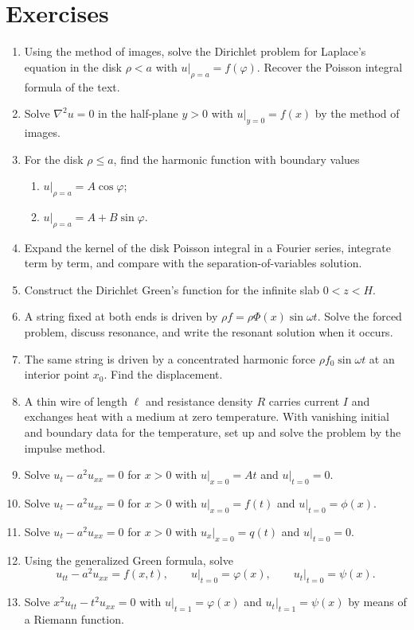 \section{Exercises}

\begin{enumerate}
\item Using the method of images, solve the Dirichlet problem for Laplace's equation in the disk $\rho<a$ with $u|_{\rho=a}=f(\varphi)$. Recover the Poisson integral formula of the text.

\item Solve $\nabla^2 u=0$ in the half-plane $y>0$ with $u|_{y=0}=f(x)$ by the method of images.

\item For the disk $\rho\le a$, find the harmonic function with boundary values
\begin{enumerate}
\item $u|_{\rho=a}=A\cos\varphi$;
\item $u|_{\rho=a}=A+B\sin\varphi$.
\end{enumerate}

\item Expand the kernel of the disk Poisson integral in a Fourier series, integrate term by term, and compare with the separation-of-variables solution.

\item Construct the Dirichlet Green's function for the infinite slab $0<z<H$.

\item A string fixed at both ends is driven by $\rho f=\rho\Phi(x)\sin\omega t$. Solve the forced problem, discuss resonance, and write the resonant solution when it occurs.

\item The same string is driven by a concentrated harmonic force $\rho f_0\sin\omega t$ at an interior point $x_0$. Find the displacement.

\item A thin wire of length $\ell$ and resistance density $R$ carries current $I$ and exchanges heat with a medium at zero temperature. With vanishing initial and boundary data for the temperature, set up and solve the problem by the impulse method.

\item Solve $u_t-a^2 u_{xx}=0$ for $x>0$ with $u|_{x=0}=At$ and $u|_{t=0}=0$.

\item Solve $u_t-a^2 u_{xx}=0$ for $x>0$ with $u|_{x=0}=f(t)$ and $u|_{t=0}=\phi(x)$.

\item Solve $u_t-a^2 u_{xx}=0$ for $x>0$ with $u_x|_{x=0}=q(t)$ and $u|_{t=0}=0$.

\item Using the generalized Green formula, solve
\begin{equation}
u_{tt}-a^2 u_{xx}=f(x,t),
\qquad
u\big|_{t=0}=\varphi(x),
\qquad
u_t\big|_{t=0}=\psi(x).
\end{equation}

\item Solve $x^2 u_{tt}-t^2 u_{xx}=0$ with $u|_{t=1}=\varphi(x)$ and $u_t|_{t=1}=\psi(x)$ by means of a Riemann function.
\end{enumerate}
